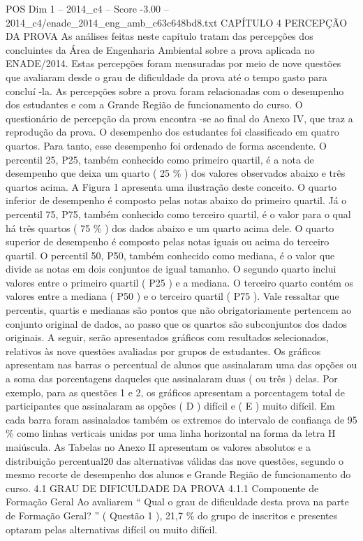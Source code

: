 \begin{textsample}{POS Dim 1 – 2014\_c4 – Score -3.00 – 2014\_c4/enade\_2014\_eng\_amb\_c63c648bd8.txt}  \label{ex:f1_pos_312}
CAPÍTULO 4 PERCEPÇÃO DA PROVA As análises feitas neste capítulo tratam das percepções dos concluintes da Área de Engenharia Ambiental sobre a prova aplicada no ENADE/2014.
Estas percepções foram mensuradas por meio de nove questões que avaliaram desde o grau de dificuldade da prova até o tempo gasto para concluí -la.
As percepções sobre a prova foram relacionadas com o desempenho dos estudantes e com a Grande Região de funcionamento do curso.
O questionário de percepção da prova encontra -se ao final do Anexo IV, que traz a reprodução da prova.
O desempenho dos estudantes foi classificado em quatro quartos.
Para tanto, esse desempenho foi ordenado de forma ascendente.
O percentil 25, P25, também conhecido como primeiro quartil, é a nota de desempenho que deixa um quarto ( 25 \% ) dos valores observados abaixo e três quartos acima.
A Figura 1 apresenta uma ilustração deste conceito.
O quarto inferior de desempenho é composto pelas notas abaixo do primeiro quartil.
Já o percentil 75, P75, também conhecido como terceiro quartil, é o valor para o qual há três quartos ( 75 \% ) dos dados abaixo e um quarto acima dele.
O quarto superior de desempenho é composto pelas notas iguais ou acima do terceiro quartil.
O percentil 50, P50, também conhecido como mediana, é o valor que divide as notas em dois conjuntos de igual tamanho.
O segundo quarto inclui valores entre o primeiro quartil ( P25 ) e a mediana.
O terceiro quarto contém os valores entre a mediana ( P50 ) e o terceiro quartil ( P75 ).
Vale ressaltar que percentis, quartis e medianas são pontos que não obrigatoriamente pertencem ao conjunto original de dados, ao passo que os quartos são subconjuntos dos dados originais.
A seguir, serão apresentados gráficos com resultados selecionados, relativos às nove questões avaliadas por grupos de estudantes.
Os gráficos apresentam nas barras o percentual de alunos que assinalaram uma das opções ou a soma das porcentagens daqueles que assinalaram duas ( ou três ) delas.
Por exemplo, para as questões 1 e 2, os gráficos apresentam a porcentagem total de participantes que assinalaram as opções ( D ) difícil e ( E ) muito difícil.
Em cada barra foram assinalados também os extremos do intervalo de confiança de 95 \% como linhas verticais unidas por uma linha horizontal na forma da letra H maiúscula.
As Tabelas no Anexo II apresentam os valores absolutos e a distribuição percentual20 das alternativas válidas das nove questões, segundo o mesmo recorte de desempenho dos alunos e Grande Região de funcionamento do curso. 4.1 GRAU DE DIFICULDADE DA PROVA 4.1.1 Componente de Formação Geral Ao avaliarem “ Qual o grau de dificuldade desta prova na parte de Formação Geral? ” ( Questão 1 ), 21,7 \% do grupo de inscritos e presentes optaram pelas alternativas difícil ou muito difícil.

\end{textsample}
